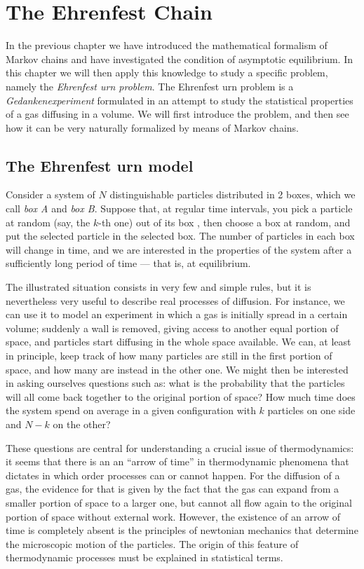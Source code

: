 \chapter{The Ehrenfest Chain} \label{ch:3}
In the previous chapter we have introduced the mathematical formalism of Markov chains and have investigated the condition of asymptotic equilibrium. In this chapter we will then apply this knowledge to study a specific problem, namely the \emph{Ehrenfest urn problem}. The Ehrenfest urn problem is a \emph{Gedankenexperiment} formulated in an attempt to study the statistical properties of a gas diffusing in a volume. We will first introduce the problem, and then see how it can be very naturally formalized by means of Markov chains.

\section{The Ehrenfest urn model}
Consider a system of $N$ distinguishable particles distributed in 2 boxes, which we call \emph{box A} and \emph{box B}. Suppose that, at regular time intervals, you pick a particle at random (say, the $k$-th one) out of its box , then choose a box at random, and put the selected particle in the selected box. The number of particles in each box will change in time, and we are interested in the properties of the system after a sufficiently long period of time --- that is, at equilibrium.

The illustrated situation consists in very few and simple rules, but it is nevertheless very useful to describe real processes of diffusion. For instance, we can use it to model an experiment in which a gas is initially spread in a certain volume; suddenly a wall is removed, giving access to another equal portion of space, and particles start diffusing in the whole space available. We can, at least in principle, keep track of how many particles are still in the first portion of space, and how many are instead in the other one. We might then be interested in asking ourselves questions such as: what is the probability that the particles will all come back together to the original portion of space? How much time does the system spend on average in a given configuration with $k$ particles on one side and $N - k$ on the other? 

These questions are central for understanding a crucial issue of thermodynamics: it seems that there is an an \enquote{arrow of time} in thermodynamic phenomena that dictates in which order processes can or cannot happen. For the diffusion of a gas, the evidence for that is given by the fact that the gas can expand from a smaller portion of space to a larger one, but cannot all flow again to the original portion of space without external work. However, the existence of an arrow of time is completely absent is the principles of newtonian mechanics that determine the microscopic motion of the particles. The origin of this feature of thermodynamic processes must be explained in statistical terms.


